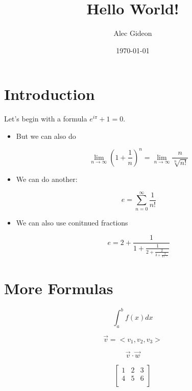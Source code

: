 \documentclass{report}
\title{Hello World!}
\author{Alec Gideon}
\date{\today}
\begin{document}
\maketitle
\section*{Introduction}
Let's begin with a formula $e^{i\pi} +1=0$.

\begin{itemize}
    \item But we can also do

          $$
              \lim_{n \to \infty} \left(1+\frac{1}{n}\right)^n = \lim_{n \to \infty} \frac{n}{\sqrt[n]{n!}}
          $$

    \item We can do another:

          $$
              e=\sum_{n=0}^{\infty} \frac{1}{n!}
          $$

    \item We can also use conitnued fractions

          $$
              e = 2 + \frac{1}{1 + \frac{1}{2 + \frac{2}{3 + \frac{3}{4+\ddots}}}}
          $$
\end{itemize}

\section*{More Formulas}

$$ \int_{a}^{b}f(x)dx$$


$$ \vec{v} = <v_1,v_2,v_3>$$

$$\vec{v}\cdot \vec{w} $$

$$
    \begin{bmatrix}
        1 & 2 & 3 \\
        4 & 5 & 6 \\
    \end{bmatrix}
$$
\end{document}
